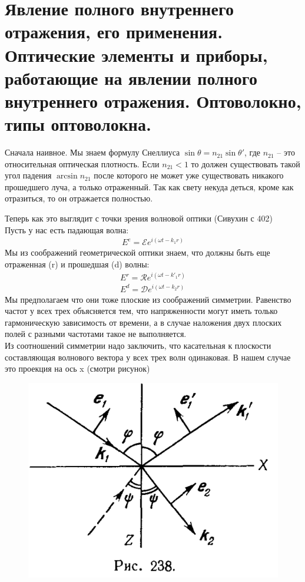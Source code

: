 \documentclass[a4paper, 12pt]{article}
\begin{document}
	\section{Явление полного внутреннего отражения, его применения. Оптические элементы и
		приборы, работающие на явлении полного внутреннего отражения. Оптоволокно,
		типы оптоволокна.}
	Сначала наивное. Мы знаем формулу Снеллиуса $\sin \theta = n_{21} \sin \theta'$, где $n_{21}$ -- это относительная оптическая плотность. Если $n_{21} < 1$ то должен существовать такой угол падения $\arcsin n_{21}$ после которого не может уже существовать никакого прошедшего луча, а только отраженный. Так как свету некуда деться, кроме как отразиться, то он отражается полностью. 
	
	Теперь как это выглядит с точки зрения волновой оптики (Сивухин с 402)\\
	Пусть у нас есть падающая волна:
	\begin{align*}
		E^{e} = \mathcal{E} e^{i(\omega t - k_1 r)}
	\end{align*}
	Мы из соображений геометрической оптики знаем, что должны быть еще отраженная (r) и прошедшая (d) волны:
	\begin{align*}
	E^{r} = \mathcal{R} e^{i(\omega t - k'_1 r)}\\E^{d} = \mathcal{D} e^{i(\omega t - k_2 r)}
	\end{align*}
	Мы предполагаем что они тоже плоские из соображений симметрии. Равенство частот у всех трех объясняется тем, что напряженности могут иметь только гармоническую зависимость от времени, а в случае наложения двух плоских полей с разными частотами такое не выполняется.\\
	Из соотношений симметрии надо заключить, что касательная к плоскости составляющая волнового вектора у всех трех волн одинаковая. В нашем случае это проекция на ось x (смотри рисунок)
	\begin{figure}[H]
		\includegraphics*[scale = 0.3]{2_1}
	\end{figure}
\end{document}

